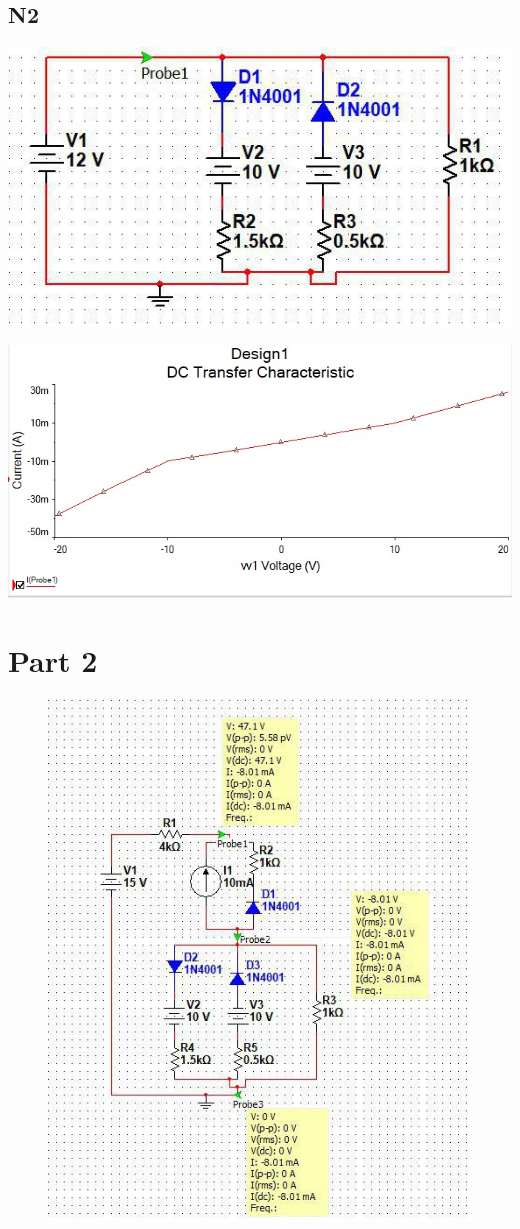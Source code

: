 \documentclass{report}
\newenvironment{Figure}
  {\par\medskip\minipage{\linewidth}}
  {\endminipage\par\medskip}
\begin{document}
\begin{multicols}{2}
        \subsection*{N2}
                \begin{center}
                    \begin{Figure}
                        \includegraphics[width=0.5\linewidth]{net2.jpg}
                    \end{Figure}
                    \begin{Figure}
                        \includegraphics[width=0.5\linewidth]{graph2.jpg}
                    \end{Figure}
                \end{center}
        \end{multicols}

    \section*{Part 2}
        \begin{figure}[!h]
            \includegraphics{part2.jpg}
        \end{figure}
\end{document}
